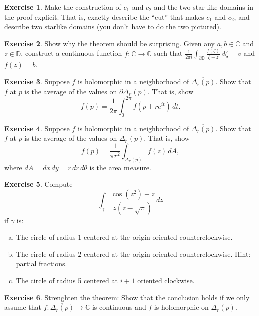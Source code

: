 \documentclass[12pt,openany]{book}
\newcommand{\C}{{\mathbb{C}}}
\newcommand{\D}{{\mathbb{D}}}
\theoremstyle{plain}
\theoremstyle{remark}
\theoremstyle{definition}
\newenvironment{exbox}{%
    \def\FrameCommand{\vrule width 1pt \relax\hspace {10pt}}%
    \MakeFramed {\advance \hsize -\width \FrameRestore }%
}{%
    \endMakeFramed
}
\newenvironment{exparts}{%
    \leavevmode\begin{enumerate}[a),noitemsep,topsep=0pt,parsep=0pt,partopsep=0pt]
}{%
    \end{enumerate}
}
\theoremstyle{exercise}
\newtheorem{exercise}{Exercise}[section]
\theoremstyle{example}
\begin{document}
\begin{exbox}
\begin{exercise}
Make the construction of $c_1$ and $c_2$ and the two star-like domains
in the proof explicit.  That is, exactly describe the ``cut'' that makes
$c_1$ and $c_2$, and describe two starlike domains (you don't have to do the
two pictured).
\end{exercise}

\begin{exercise}
Show why the theorem should be surprising.  Given any $a,b \in \C$ and $z
\in \D$, construct a continuous function
$f \colon \C \to \C$ such that $\frac{1}{2\pi i}\int_{\partial \D}
\frac{f(\zeta)}{\zeta -z} \, d\zeta = a$ and $f(z) = b$.
\end{exercise}

\begin{exercise}
Suppose $f$ is holomorphic in a neighborhood of $\overline{\Delta_r(p)}$.
Show that $f$ at $p$ is the average of the values on $\partial \Delta_r(p)$.
That is, show
\begin{equation*}
f(p) = \frac{1}{2\pi} \int_0^{2\pi} f(p + r e^{it}) \, dt .
\end{equation*}
\end{exercise}

\begin{exercise}
Suppose $f$ is holomorphic in a neighborhood of $\overline{\Delta_r(p)}$.
Show that $f$ at $p$ is the average of the values on $\Delta_r(p)$.
That is, show
\begin{equation*}
f(p) = \frac{1}{\pi r^2} \int_{\Delta_r(p)} f(z) \, dA ,
\end{equation*}
where $dA = dx \, dy = r \, dr \, d\theta$ is the area measure.
\end{exercise}

\begin{exercise}
Compute 
\begin{equation*}
\int_\gamma \frac{\cos ( z^2 ) +z}{z(z-\sqrt{\pi})} \, dz
\end{equation*}
if $\gamma$ is:
\begin{exparts}
\item
The circle of radius $1$ centered at the origin oriented
counterclockwise.
\item
The circle of radius $2$ centered at the origin oriented
counterclockwise.  Hint: partial fractions.
\item
The circle of radius 5 centered at $i+1$ oriented clockwise.
\end{exparts}
\end{exercise}

\begin{exercise} \label{exercise:cauchycont}
Strenghten the theorem:  Show that the conclusion holds if
we only assume that $f \colon \overline{\Delta_r(p)} \to \C$
is continuous and $f$ is holomorphic on $\Delta_r(p)$.
\end{exercise}
\end{exbox}
\end{document}
